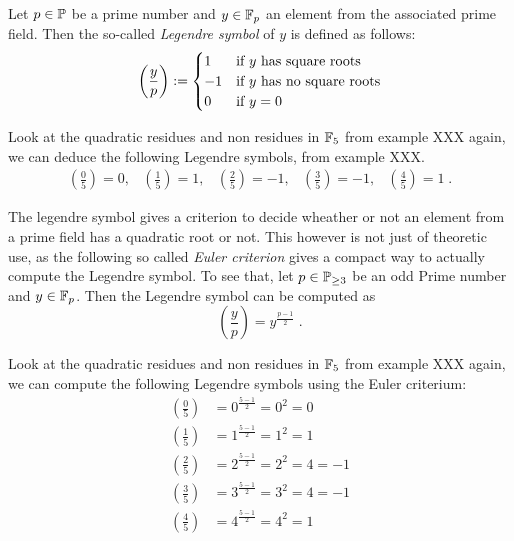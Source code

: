 Let $ p \in \mathbb{P} $ be a prime number and $ y \in \mathbb{F}_p $ an element from the associated prime field. Then the so-called \textit{Legendre symbol} of $ y $ is defined as follows:
\begin{equation}
\label{eq: Legendre-symbol}
\left (\frac{y}{p} \right): =
\begin{cases}
1 & \text{if $ y $ has square roots} \\
-1 & \text{if $ y $ has no square roots} \\
0 & \text{if $ y = 0 $}
\end{cases}
\end{equation}
\begin{example}
Look at the quadratic residues and non residues in $\mathbb{F}_5$ from example XXX again, we can deduce the following Legendre symbols, from example XXX.
$$
\begin{array}{ccccc}
\left (\frac{0}{5} \right) = 0, &
\left (\frac{1}{5} \right) = 1, &
\left (\frac{2}{5} \right) = -1, &
\left (\frac{3}{5} \right) = -1, &
\left (\frac{4}{5} \right) = 1 \;.
\end{array}
$$
\end{example}
The legendre symbol gives a criterion to decide wheather or not an element from a prime field has a quadratic root or not. This however is not just of theoretic use, as the following so called \textit{Euler criterion} gives a compact way to actually compute the Legendre symbol. To see that, let $ p \in \mathbb{P}_{\geq 3} $ be an odd 
Prime number and $ y \in \mathbb{F}_p $. Then the Legendre symbol can be computed as 
\begin{equation}
\label{eq: Euler_criterium}
\left (\frac{y}{p} \right) = y^{\frac{p-1}{2}} \;.
\end{equation}
\begin{example}
Look at the quadratic residues and non residues in $\mathbb{F}_5$ from example XXX again, we can compute the following Legendre symbols using the Euler criterium:
\begin{align*}
\left (\frac{0}{5} \right) &= 0^{\frac{5-1}{2}}= 0^2=0\\
\left (\frac{1}{5} \right) &= 1^{\frac{5-1}{2}}= 1^2=1\\
\left (\frac{2}{5} \right) &= 2^{\frac{5-1}{2}}= 2^2=4 = -1\\
\left (\frac{3}{5} \right) &= 3^{\frac{5-1}{2}}= 3^2=4 =-1\\
\left (\frac{4}{5} \right) &= 4^{\frac{5-1}{2}}= 4^2=1
\end{align*}
\end{example}
